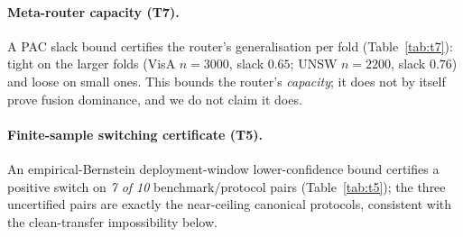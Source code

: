 \documentclass[10pt,conference]{IEEEtran}
\begin{document}
\begin{table}[t]\centering
\caption{Validated theory stack T1--T9 (+ the gate-decision rule, GDR): what each result
certifies and the boundary it leaves open. All rows re-run green in
\texttt{validate\_theorem\_stack.py}.}
\label{tab:theory-map}\footnotesize

\end{table}

\paragraph{Meta-router capacity (T7).} A PAC slack bound certifies the router's
generalisation per fold (Table~\ref{tab:t7}): tight on the larger folds (VisA $n{=}3000$,
slack $0.65$; UNSW $n{=}2200$, slack $0.76$) and loose on small ones. This bounds the
router's \emph{capacity}; it does not by itself prove fusion dominance, and we do not
claim it does.

\begin{table}[t]\centering
\caption{T7 PAC meta-router capacity bound (auditable $(n,B,R)$ slack per fold; tight
where slack $<1$). Bounds the router; composes with T1/T2/T6 rather than proving fusion
dominance.}
\label{tab:t7}\footnotesize

\end{table}

\paragraph{Finite-sample switching certificate (T5).} An empirical-Bernstein
deployment-window lower-confidence bound certifies a positive switch on \emph{7 of 10}
benchmark/protocol pairs (Table~\ref{tab:t5}); the three uncertified pairs are exactly the
near-ceiling canonical protocols, consistent with the clean-transfer impossibility below.

\begin{table}[t]\centering
\caption{T5 finite-sample switching certificate (empirical-Bernstein LCB at $\delta=0.05$).
Certified on 7 of 10 pairs; the uncertified three are near-ceiling canonical protocols.}
\label{tab:t5}\footnotesize

\end{table}
\end{document}
